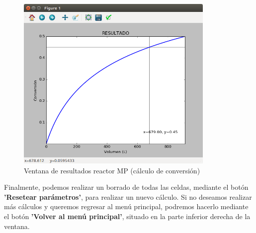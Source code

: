 \begin{figure}[h!]
	\begin{center}
		\includegraphics[width=0.85\textwidth]{./imagenes/reactor_fp/mezcla_perfecta4.png}\caption{Ventana de resultados reactor MP (cálculo de conversión)}\label{fig:ventana_graficas_conversion}
	\end{center}
\end{figure}

Finalmente, podemos realizar un borrado de todas las celdas, mediante el botón \textbf{'Resetear parámetros'}, para realizar un nuevo cálculo. Si no deseamos realizar más cálculos y queremos regresar al menú principal, podremos hacerlo mediante el botón \textbf{'Volver al menú principal'}, situado en la parte inferior derecha de la ventana.